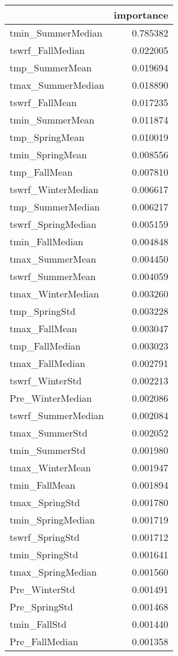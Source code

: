 \begin{tabular}{lr}
\toprule
 & importance \\
\midrule
tmin_SummerMedian & 0.785382 \\
tswrf_FallMedian & 0.022005 \\
tmp_SummerMean & 0.019694 \\
tmax_SummerMedian & 0.018890 \\
tswrf_FallMean & 0.017235 \\
tmin_SummerMean & 0.011874 \\
tmp_SpringMean & 0.010019 \\
tmin_SpringMean & 0.008556 \\
tmp_FallMean & 0.007810 \\
tswrf_WinterMedian & 0.006617 \\
tmp_SummerMedian & 0.006217 \\
tswrf_SpringMedian & 0.005159 \\
tmin_FallMedian & 0.004848 \\
tmax_SummerMean & 0.004450 \\
tswrf_SummerMean & 0.004059 \\
tmax_WinterMedian & 0.003260 \\
tmp_SpringStd & 0.003228 \\
tmax_FallMean & 0.003047 \\
tmp_FallMedian & 0.003023 \\
tmax_FallMedian & 0.002791 \\
tswrf_WinterStd & 0.002213 \\
Pre_WinterMedian & 0.002086 \\
tswrf_SummerMedian & 0.002084 \\
tmax_SummerStd & 0.002052 \\
tmin_SummerStd & 0.001980 \\
tmax_WinterMean & 0.001947 \\
tmin_FallMean & 0.001894 \\
tmax_SpringStd & 0.001780 \\
tmin_SpringMedian & 0.001719 \\
tswrf_SpringStd & 0.001712 \\
tmin_SpringStd & 0.001641 \\
tmax_SpringMedian & 0.001560 \\
Pre_WinterStd & 0.001491 \\
Pre_SpringStd & 0.001468 \\
tmin_FallStd & 0.001440 \\
Pre_FallMedian & 0.001358 \\

\end{tabular}
